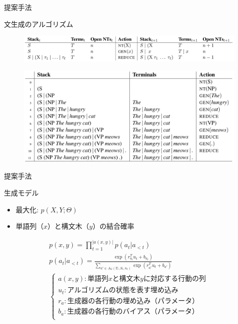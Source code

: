 \documentclass[aspectratio=43,unicode,10pt]{beamer}
\begin{document}
\begin{frame}{提案手法}
  \begin{block}{文生成のアルゴリズム}
    \begin{figure}
        \includegraphics[width=\textwidth]{fig/fig_3.png}
    \end{figure}
    \vspace{-1ex} %
    \begin{figure}
        \includegraphics[width=\textwidth]{fig/fig_4.png}
    \end{figure}
  \end{block}
\end{frame}

\begin{frame}{提案手法}
  \begin{block}{生成モデル}
    \begin{itemize}
      \item 最大化: $p(X, Y; \Theta)$
      \item 単語列（$x$）と構文木（$y$）の結合確率
    \end{itemize}
    \begin{gather*}
      p(x, y) = \prod_{t=1}^{|a(x, y)|} p(a_t | a_{<t}) \\
      p(a_t | a_{<t})
      = \frac{\exp (r_{a_t}^T u_t + b_{a_t})}
        {\sum_{a' \in A_G(T_t, S_t, n_t)} \exp (r_{a'}^T u_t + b_{a'})} \\
      \begin{cases}
        a(x, y): \text{単語列$x$と構文木$y$に対応する行動の列} \\
        u_t: \text{アルゴリズムの状態を表す埋め込み} \\
        r_a: \text{生成器の各行動の埋め込み（パラメータ）} \\
        b_a: \text{生成器の各行動のバイアス（パラメータ）} \\
      \end{cases}
    \end{gather*}
  \end{block}
\end{frame}
\end{document}
